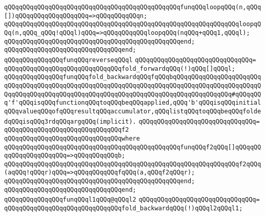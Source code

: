 \verb|qQQqqQQqqQQqqQQqqQQqqQQqqQQqqQQqqQQqqQQqqQQqqQQqfunqQQqloopqQQq(n,qQQq[])qQQqqQQqqQQqqQQqqQQq=>qQQqqQQqqQQqn;|\newline
\verb|qQQqqQQqqQQqqQQqqQQqqQQqqQQqqQQqqQQqqQQqqQQqqQQqqQQqqQQqqQQqqQQqloopqQQq(n,qQQq_qQQq!qQQql)qQQq=>qQQqqQQqqQQqloopqQQq(nqQQq+qQQq1,qQQql);|\newline
\verb|qQQqqQQqqQQqqQQqqQQqqQQqqQQqqQQqqQQqqQQqqQQqqQQqend;|\newline
\verb|qQQqqQQqqQQqqQQqqQQqqQQqqQQqqQQqend;|\newline
\newline
\verb|qQQqqQQqqQQqqQQqfunqQQqreverseqQQql|\newline
\verb|qQQqqQQqqQQqqQQqqQQqqQQqqQQqqQQq=|\newline
\verb|qQQqqQQqqQQqqQQqqQQqqQQqqQQqqQQqfold_forwardqQQq(!)qQQq[]qQQql;|\newline
\newline
\verb|qQQqqQQqqQQqqQQqfunqQQqfold_backwardqQQqfqQQqbqQQqqQQqqQQqqQQqqQQqqQQqqQQqqQQqqQQqqQQqqQQqqQQqqQQqqQQqqQQqqQQqqQQqqQQqqQQqqQQqqQQqqQQqqQQqqQQqqQQqqQQqqQQqqQQqqQQqqQQqqQQqqQQqqQQqqQQqqQQqqQQqqQQqqQQqqQQq#qQQqqQQq'f'qQQqisqQQqfunctionqQQqtoqQQqbeqQQqapplied,qQQq'b'qQQqisqQQqinitialqQQqvalueqQQqofqQQqresultqQQqaccumulator,qQQqlistqQQqtoqQQqbeqQQqfoldedqQQqisqQQq3rdqQQqargqQQq(implicit).|\newline
\verb|qQQqqQQqqQQqqQQqqQQqqQQqqQQqqQQq=|\newline
\verb|qQQqqQQqqQQqqQQqqQQqqQQqqQQqqQQqf2|\newline
\verb|qQQqqQQqqQQqqQQqqQQqqQQqqQQqqQQqwhere|\newline
\verb|qQQqqQQqqQQqqQQqqQQqqQQqqQQqqQQqqQQqqQQqqQQqqQQqfunqQQqf2qQQq[]qQQqqQQqqQQqqQQqqQQqqQQq=>qQQqqQQqqQQqb;|\newline
\verb|qQQqqQQqqQQqqQQqqQQqqQQqqQQqqQQqqQQqqQQqqQQqqQQqqQQqqQQqqQQqqQQqf2qQQq(aqQQq!qQQqr)qQQq=>qQQqqQQqqQQqfqQQq(a,qQQqf2qQQqr);|\newline
\verb|qQQqqQQqqQQqqQQqqQQqqQQqqQQqqQQqqQQqqQQqqQQqqQQqend;|\newline
\verb|qQQqqQQqqQQqqQQqqQQqqQQqqQQqqQQqend;|\newline
\newline
\verb|qQQqqQQqqQQqqQQqfunqQQql1qQQq@qQQql2|\newline
\verb|qQQqqQQqqQQqqQQqqQQqqQQqqQQqqQQq=|\newline
\verb|qQQqqQQqqQQqqQQqqQQqqQQqqQQqqQQqfold_backwardqQQq(!)qQQql2qQQql1;|\newline
\newline
